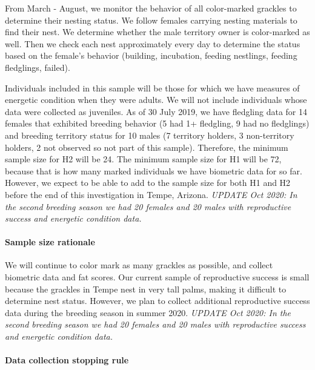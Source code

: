 \documentclass[
]{article}
\begin{document}
From March - August, we monitor the behavior of all color-marked
grackles to determine their nesting status. We follow females carrying
nesting materials to find their nest. We determine whether the male
territory owner is color-marked as well. Then we check each nest
approximately every day to determine the status based on the female's
behavior (building, incubation, feeding nestlings, feeding fledglings,
failed).

Individuals included in this sample will be those for which we have
measures of energetic condition when they were adults. We will not
include individuals whose data were collected as juveniles. As of 30
July 2019, we have fledgling data for 14 females that exhibited breeding
behavior (5 had 1+ fledgling, 9 had no fledglings) and breeding
territory status for 10 males (7 territory holders, 3 non-territory
holders, 2 not observed so not part of this sample). Therefore, the
minimum sample size for H2 will be 24. The minimum sample size for H1
will be 72, because that is how many marked individuals we have
biometric data for so far. However, we expect to be able to add to the
sample size for both H1 and H2 before the end of this investigation in
Tempe, Arizona. \emph{UPDATE Oct 2020: In the second breeding season we
had 20 females and 20 males with reproductive success and energetic
condition data.}

\hypertarget{sample-size-rationale}{%
\paragraph{\texorpdfstring{\textbf{Sample size
rationale}}{Sample size rationale}}\label{sample-size-rationale}}

We will continue to color mark as many grackles as possible, and collect
biometric data and fat scores. Our current sample of reproductive
success is small because the grackles in Tempe nest in very tall palms,
making it difficult to determine nest status. However, we plan to
collect additional reproductive success data during the breeding season
in summer 2020. \emph{UPDATE Oct 2020: In the second breeding season we
had 20 females and 20 males with reproductive success and energetic
condition data.}

\hypertarget{data-collection-stopping-rule}{%
\paragraph{\texorpdfstring{\textbf{Data collection stopping
rule}}{Data collection stopping rule}}\label{data-collection-stopping-rule}}
\end{document}
